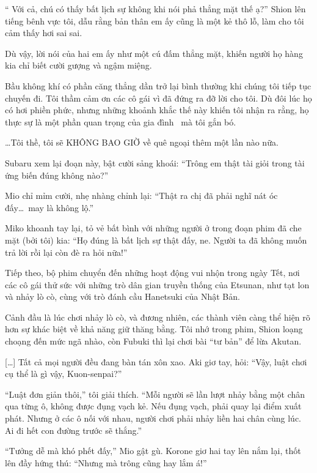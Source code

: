 \documentclass[../main.tex]{subfiles}
\begin{document}
``{\color{red} Với cả, chú có thấy bất lịch sự không khi nói phả thẳng mặt thế ạ?}'' Shion lên tiếng bênh vực tôi, dẫu rằng bản thân em ấy cũng là một kẻ thô lỗ, làm cho tôi cảm thấy hơi sai sai.

Dù vậy, lời nói của hai em ấy như một cú đấm thẳng mặt, khiến người họ hàng kia chỉ biết cười gượng và ngậm miệng.

Bầu không khí có phần căng thẳng dần trở lại bình thường khi chúng tôi tiếp tục chuyến đi. Tôi thầm cảm ơn các cô gái vì đã đứng ra đỡ lời cho tôi. Dù đôi lúc họ có hơi phiền phức, nhưng những khoảnh khắc thế này khiến tôi nhận ra rằng, họ thực sự là một phần quan trọng của gia đình \hll\ mà tôi gắn bó.

\dots Tôi thề, tôi sẽ KHÔNG BAO GIỜ về quê ngoại thêm một lần nào nữa.

\il

Subaru xem lại đoạn này, bật cười sảng khoái: ``Trông em thật tài giỏi trong tài ứng biến đúng không nào?''

Mio chỉ mỉm cười, nhẹ nhàng chỉnh lại: ``Thật ra chị đã phải nghĩ nát óc đấy\dots\ may là không lộ.''

Miko khoanh tay lại, tỏ vẻ bất bình với những người ở trong đoạn phim đã che mặt (bởi tôi) kia: ``Họ đúng là bất lịch sự thật đấy, ne. Người ta đã không muốn trả lời rồi lại còn đè ra hỏi nữa!''

Tiếp theo, bộ phim chuyển đến những hoạt động vui nhộn trong ngày Tết, nơi các cô gái thử sức với những trò dân gian truyền thống của Etsunan, như tạt lon và nhảy lò cò, cùng với trò đánh cầu Hanetsuki của Nhật Bản.

Cảnh đầu là lúc chơi nhảy lò cò, và đương nhiên, các thành viên càng thể hiện rõ hơn sự khác biệt về khả năng giữ thăng bằng. Tôi nhớ trong phim, Shion loạng choạng đến mức ngã nhào, còn Fubuki thì lại chơi bài ``tư bản'' để lừa Akutan.

\il

[\dots] Tất cả mọi người đều đang bàn tán xôn xao. Aki giơ tay, hỏi: ``Vậy, luật chơi cụ thể là gì vậy, Kuon-senpai?''

``Luật đơn giản thôi,'' tôi giải thích. ``Mỗi người sẽ lần lượt nhảy bằng một chân qua từng ô, không được đụng vạch kẻ. Nếu đụng vạch, phải quay lại điểm xuất phát. Nhưng ở các ô nối với nhau, người chơi phải nhảy liền hai chân cùng lúc. Ai đi hết con đường trước sẽ thắng.''

``Tưởng dễ mà khó phết đấy,'' Mio gật gù. Korone giơ hai tay lên nắm lại, thốt lên đầy hứng thú: ``Nhưng mà trông cũng hay lắm á!''
\end{document}
